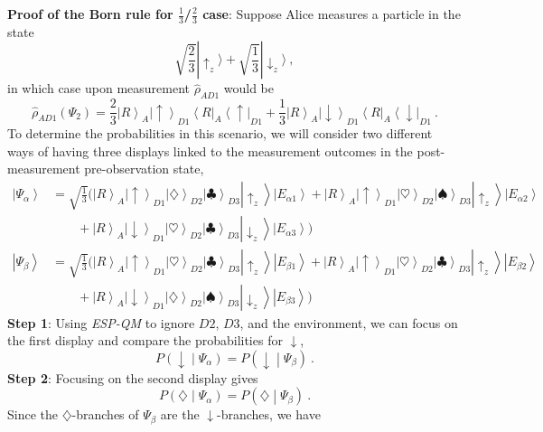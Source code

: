 \documentclass[onecolumn,secnumarabic,amsmath,amssymb,balancelastpage,nofootinbib]{article}
\newcommand{\bra}[1]{\ensuremath{\left\langle#1\right|}}
\newcommand{\ket}[1]{\ensuremath{\left|#1\right\rangle}}
\begin{document}
\textbf{Proof of the Born rule for $\frac{1}{3}$/$\frac{2}{3}$ case}:  Suppose Alice measures a particle in the state
\begin{equation}
\sqrt{\frac{2}{3}}|\uparrow_z\rangle+\sqrt{\frac{1}{3}}|\downarrow_z\rangle\ ,
\end{equation}
in which case upon measurement $\widehat{\rho}_{AD1}$ would be
\begin{equation}
\widehat{\rho}_{AD1}\left(\Psi_2\right)=\frac{2}{3}\ket{R}_A\ket{\uparrow}_{D1}\bra{R}_A\bra{\uparrow}_{D1}+\frac{1}{3}\ket{R}_A\ket{\downarrow}_{D1}\bra{R}_A\bra{\downarrow}_{D1}\ .
\label{23reduced}
\end{equation}
To determine the probabilities in this scenario, we will consider two different ways of having three displays linked to the measurement outcomes in the post-measurement pre-observation state,
\begin{align} \ket{\Psi_\alpha}&=\sqrt{\frac{1}{3}}\Big(\ket{R}_A\ket{\uparrow}_{D1}\ket{\diamondsuit}_{D2}\ket{\clubsuit}_{D3}\ket{\uparrow_z}\ket{E_{\alpha 1}}+\ket{R}_A\ket{\uparrow}_{D1}\ket{\heartsuit}_{D2}\ket{\spadesuit}_{D3}\ket{\uparrow_z}\ket{E_{\alpha 2}}
\nonumber
\\
&\qquad
+\ket{R}_A\ket{\downarrow}_{D1}\ket{\heartsuit}_{D2}\ket{\clubsuit}_{D3}\ket{\downarrow_z}\ket{E_{\alpha 3}}\Big)
\nonumber
\\
\ket{\Psi_\beta}&=\sqrt{\frac{1}{3}}\Big(\ket{R}_A\ket{\uparrow}_{D1}\ket{\heartsuit}_{D2}\ket{\clubsuit}_{D3}\ket{\uparrow_z}\ket{E_{\beta 1}}+\ket{R}_A\ket{\uparrow}_{D1}\ket{\heartsuit}_{D2}\ket{\clubsuit}_{D3}\ket{\uparrow_z}\ket{E_{\beta 2}}
\nonumber
\\
&\qquad+\ket{R}_A\ket{\downarrow}_{D1}\ket{\diamondsuit}_{D2}\ket{\spadesuit}_{D3}\ket{\downarrow_z}\ket{E_{\beta 3}}\Big)
\label{alphaandbetastates}
\end{align}
\textbf{Step 1}:  Using \emph{ESP-QM} to ignore $D2$, $D3$, and the environment, we can focus on the first display and compare the probabilities for $\downarrow$,
\begin{equation}
P\left(\downarrow\middle|\Psi_\alpha\right)=P\left(\downarrow\middle|\Psi_\beta\right)\ .
\label{ss1}
\end{equation}
\textbf{Step 2}:  Focusing on the second display gives
\begin{equation}
P\left(\diamondsuit\middle|\Psi_\alpha\right)=P\left(\diamondsuit\middle|\Psi_\beta\right)\ . 
\label{ss15}
\end{equation}
Since the $\diamondsuit$-branches of $\Psi_\beta$ are the $\downarrow$-branches, we have
\end{document}
